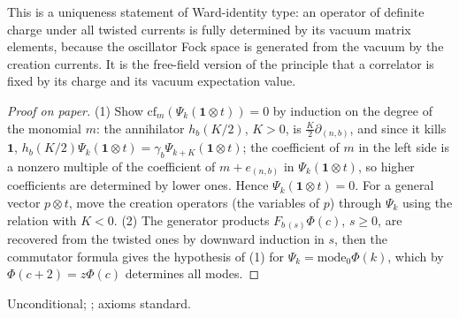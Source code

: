 \begin{physics}
This is a uniqueness statement of Ward-identity type: an operator of definite charge under all twisted currents is fully determined by its vacuum matrix elements, because the oscillator Fock space is generated from the vacuum by the creation currents. It is the free-field version of the principle that a correlator is fixed by its charge and its vacuum expectation value.
\end{physics}
\begin{proof}[Proof on paper]
(1) Show $\mathrm{cf}_m(\Psi_k(\mathbf 1\otimes t))=0$ by induction on the degree of the monomial
$m$: the annihilator $h_b(K/2)$, $K>0$, is $\frac K2\partial_{(n,b)}$, and since it kills
$\mathbf 1$, $h_b(K/2)\Psi_k(\mathbf 1\otimes t)=\gamma_b\Psi_{k+K}(\mathbf 1\otimes t)$; the coefficient
of $m$ in the left side is a nonzero multiple of the coefficient of $m+e_{(n,b)}$ in
$\Psi_k(\mathbf 1\otimes t)$, so higher coefficients are determined by lower ones.  Hence
$\Psi_k(\mathbf 1\otimes t)=0$.  For a general vector $p\otimes t$, move the creation operators
(the variables of $p$) through $\Psi_k$ using the relation with $K<0$.  (2) The generator products
$F_{b\,(s)}\Phi(c)$, $s\ge0$, are recovered from the twisted ones by downward induction in $s$,
then the commutator formula gives the hypothesis of (1) for $\Psi_k=\mathrm{mode}_0\Phi(k)$, which
by $\Phi(c+2)=z\Phi(c)$ determines all modes.
\end{proof}
\begin{status}
Unconditional; ; axioms standard.
\end{status}


